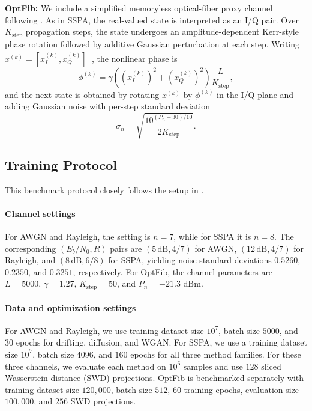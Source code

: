 \documentclass[conference]{IEEEtran}
\begin{document}
\textbf{OptFib:}
We include a simplified memoryless optical-fiber proxy channel following \cite{li2018e2efiber}. As in SSPA, the real-valued state is interpreted as an I/Q pair. Over \(K_{\text{step}}\) propagation steps, the state undergoes an amplitude-dependent Kerr-style phase rotation followed by additive Gaussian perturbation at each step. Writing \(x^{(k)}=[x_I^{(k)},x_Q^{(k)}]^\top\), the nonlinear phase is
\begin{equation}
\phi^{(k)}
=
\gamma \left(\left(x_I^{(k)}\right)^2 + \left(x_Q^{(k)}\right)^2\right)\frac{L}{K_{\text{step}}},
\end{equation}
and the next state is obtained by rotating \(x^{(k)}\) by \(\phi^{(k)}\) in the I/Q plane and adding Gaussian noise with per-step standard deviation
\begin{equation}
  \sigma_n
  =
  \sqrt{\frac{10^{(P_n-30)/10}}{2K_{\text{step}}}}.
\end{equation}



\subsection{Training Protocol}
This benchmark protocol closely follows the setup in \cite{kimicc2024}.
\paragraph{Channel settings}
For AWGN and Rayleigh, the setting is \(n=7\), while for SSPA it is \(n=8\). The corresponding \((E_b/N_0, R)\) pairs are \((5\,\mathrm{dB}, 4/7)\) for AWGN, \((12\,\mathrm{dB}, 4/7)\) for Rayleigh, and \((8\,\mathrm{dB}, 6/8)\) for SSPA, yielding noise standard deviations \(0.5260\), \(0.2350\), and \(0.3251\), respectively. For OptFib, the channel parameters are \(L=5000\), \(\gamma=1.27\), \(K_{\text{step}}=50\), and \(P_n=-21.3\) dBm.

\paragraph{Data and optimization settings}
For AWGN and Rayleigh, we use training dataset size \(10^7\), batch size \(5000\), and \(30\) epochs for drifting, diffusion, and WGAN. For SSPA, we use a training dataset size \(10^7\), batch size \(4096\), and \(160\) epochs for all three method families. For these three channels, we evaluate each method on \(10^6\) samples and use \(128\) sliced
Wasserstein distance (SWD) projections. OptFib is benchmarked separately with training dataset size \(120{,}000\), batch size \(512\), \(60\) training epochs, evaluation size \(100{,}000\), and \(256\) SWD projections.
\end{document}
